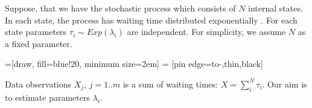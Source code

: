 \documentclass[11pt]{article}
\title{ }
\author{ }
\date{}
\begin{document}
\maketitle

\begin{abstract}
 
\end{abstract}

\section{ }\label{section:introduction}

Suppose, that we have the stochastic process which consists of $N$ internal states. In each state, the process has waiting time distributed exponentially . For each state parameters $\tau_i \sim Exp(\lambda_i)$ are independent. 
For simplicity, we assume $N$ as a fixed parameter. 
\medskip
 
 =[draw, fill=blue!20, minimum size=2em]
  = [pin edge={to-,thin,black}]
 \medskip
  \par Data observations $X_j$, $j=1..m$ is a sum of waiting times: $X = \sum_i^N \tau_i$. Our aim is to estimate parameters $\lambda_i$.
  

\subsection{ }
 

 


\end{document}

